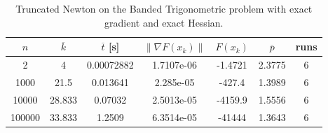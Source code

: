 \begin{table}
\caption{Truncated Newton on the Banded Trigonometric problem with exact gradient and exact Hessian.}
\label{tab:tn_trig_exact}
\begin{tabular}{ccccccc}
\toprule
$n$ & $\overline{k}$ & $\overline{t}$ [s] & $\|\nabla F(x_k)\|$ & $F(x_k)$ & $\overline{p}$ & runs \\
\midrule
2 & 4 & 0.00072882 & 1.7107e-06 & -1.4721 & 2.3775 & 6 \\
1000 & 21.5 & 0.013641 & 2.285e-05 & -427.4 & 1.3989 & 6 \\
10000 & 28.833 & 0.07032 & 2.5013e-05 & -4159.9 & 1.5556 & 6 \\
100000 & 33.833 & 1.2509 & 6.3514e-05 & -41444 & 1.3643 & 6 \\
\bottomrule
\end{tabular}
\end{table}
